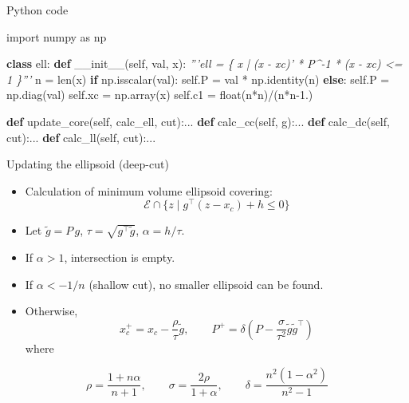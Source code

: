 \documentclass[10pt,ignorenonframetext,serif,onlymath]{beamer}
\newenvironment{Shaded}{}{}
\newcommand{\BuiltInTok}[1]{#1}
\newcommand{\CommentTok}[1]{\textcolor[rgb]{0.38,0.63,0.69}{\textit{#1}}}
\newcommand{\ControlFlowTok}[1]{\textcolor[rgb]{0.00,0.44,0.13}{\textbf{#1}}}
\newcommand{\FloatTok}[1]{\textcolor[rgb]{0.25,0.63,0.44}{#1}}
\newcommand{\FunctionTok}[1]{\textcolor[rgb]{0.02,0.16,0.49}{#1}}
\newcommand{\ImportTok}[1]{#1}
\newcommand{\KeywordTok}[1]{\textcolor[rgb]{0.00,0.44,0.13}{\textbf{#1}}}
\newcommand{\NormalTok}[1]{#1}
\newcommand{\OperatorTok}[1]{\textcolor[rgb]{0.40,0.40,0.40}{#1}}
\newcommand{\VariableTok}[1]{\textcolor[rgb]{0.10,0.09,0.49}{#1}}
\providecommand{\tightlist}{%
  \setlength{\itemsep}{0pt}\setlength{\parskip}{0pt}}
\begin{document}
\begin{frame}[fragile]{Python code}
\protect\hypertarget{sec:python-code-3}{}

\begin{Shaded}
\begin{Highlighting}[]
\ImportTok{import}\NormalTok{ numpy }\ImportTok{as}\NormalTok{ np}

\KeywordTok{class}\NormalTok{ ell:}
    \KeywordTok{def} \FunctionTok{__init__}\NormalTok{(}\VariableTok{self}\NormalTok{, val, x):}
        \CommentTok{'''ell = \{ x | (x - xc)' * P^-1 * (x - xc) <= 1 \}'''}
\NormalTok{        n }\OperatorTok{=} \BuiltInTok{len}\NormalTok{(x)}
        \ControlFlowTok{if}\NormalTok{ np.isscalar(val):}
            \VariableTok{self}\NormalTok{.P }\OperatorTok{=}\NormalTok{ val }\OperatorTok{*}\NormalTok{ np.identity(n)}
        \ControlFlowTok{else}\NormalTok{:}
            \VariableTok{self}\NormalTok{.P }\OperatorTok{=}\NormalTok{ np.diag(val)}
        \VariableTok{self}\NormalTok{.xc }\OperatorTok{=}\NormalTok{ np.array(x)}
        \VariableTok{self}\NormalTok{.c1 }\OperatorTok{=} \BuiltInTok{float}\NormalTok{(n}\OperatorTok{*}\NormalTok{n)}\OperatorTok{/}\NormalTok{(n}\OperatorTok{*}\NormalTok{n}\FloatTok{-1.}\NormalTok{)}

    \KeywordTok{def}\NormalTok{ update_core(}\VariableTok{self}\NormalTok{, calc_ell, cut):...}
    \KeywordTok{def}\NormalTok{ calc_cc(}\VariableTok{self}\NormalTok{, g):...}
    \KeywordTok{def}\NormalTok{ calc_dc(}\VariableTok{self}\NormalTok{, cut):...}
    \KeywordTok{def}\NormalTok{ calc_ll(}\VariableTok{self}\NormalTok{, cut):...}
\end{Highlighting}
\end{Shaded}

\end{frame}

\begin{frame}{Updating the ellipsoid (deep-cut)}
\protect\hypertarget{sec:updating-the-ellipsoid-deep-cut}{}

\begin{itemize}
\tightlist
\item
  Calculation of minimum volume ellipsoid covering:
  \[\mathcal{E} \cap \{z \mid g^\top (z - x_c) + h \leq 0 \}\]
\item
  Let \(\tilde{g} = P\,g\), \(\tau = \sqrt{g^\top\tilde{g}}\),
  \(\alpha = h/\tau\).
\item
  If \(\alpha > 1\), intersection is empty.
\item
  If \(\alpha < -1/n\) (shallow cut), no smaller ellipsoid can be found.
\item
  Otherwise, \[x_c^+ = x_c - \frac{\rho}{\tau} \tilde{g}, \qquad
  P^+ = \delta\left(P - \frac{\sigma}{\tau^2} \tilde{g}\tilde{g}^\top\right)
   \] where
\end{itemize}

\[\rho = \frac{1+n\alpha}{n+1}, \qquad
  \sigma = \frac{2\rho}{1+\alpha}, \qquad
  \delta = \frac{n^2(1-\alpha^2)}{n^2 - 1} \]

\end{frame}
\end{document}
